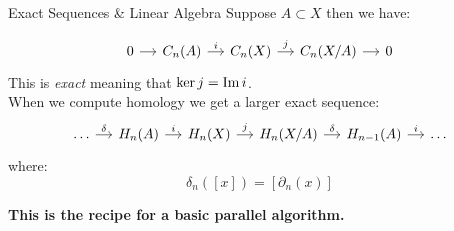 \begin{frame}{Exact Sequences \& Linear Algebra}
Suppose $A \subset X$ then we have:

\[ \begin{tikzcd}[ampersand replacement=\&, column sep=small]
0 \arrow{r} \& C_n(A) \arrow{r}{i} \& C_n(X) \arrow{r}{j} \& C_n(X/A) \arrow{r} \& 0
\end{tikzcd}
\]
This is \emph{exact} meaning that $\ker{j} = \operatorname{Im}{i}$. \\
\vspace{.5cm}
When we compute homology we get a larger exact sequence:
\[ \begin{tikzcd}[ampersand replacement=\&, column sep=small]
\ldots \arrow{r}{\delta} \& H_n(A) \arrow{r}{i} \& H_n(X) \arrow{r}{j} \& H_n(X/A) \arrow{r}{\delta} \& H_{n-1}(A) \arrow{r}{i} \& \ldots 
\end{tikzcd}
\]
where:
\[ \delta_n([x]) = [\partial_n(x)] \]

\begin{center}
\textbf{This is the recipe for a basic parallel algorithm.}
\end{center}
\end{frame}
